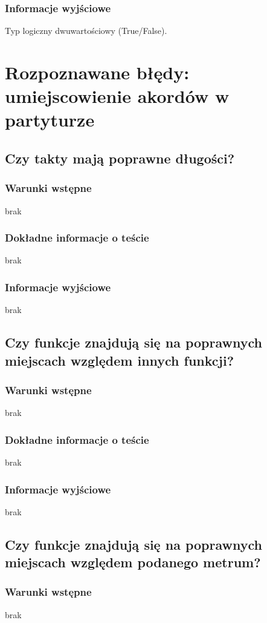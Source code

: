 \documentclass[dokumentacja.tex]{subfiles}
\begin{document}
\subsubsection{Informacje wyjściowe}
Typ logiczny dwuwartościowy (True/False).


\section{Rozpoznawane błędy: umiejscowienie akordów w partyturze}

\subsection{Czy takty mają poprawne długości?}
\subsubsection{Warunki wstępne}
brak
\subsubsection{Dokładne informacje o teście}
brak
\subsubsection{Informacje wyjściowe}
brak


\subsection{Czy funkcje znajdują się na poprawnych miejscach względem innych funkcji?}
\subsubsection{Warunki wstępne}
brak
\subsubsection{Dokładne informacje o teście}
brak
\subsubsection{Informacje wyjściowe}
brak


\subsection{Czy funkcje znajdują się na poprawnych miejscach względem podanego metrum?}
\subsubsection{Warunki wstępne}
brak
\end{document}
